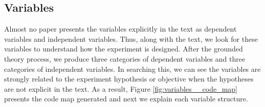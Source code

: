 	\begin{figure}[h] 

   	    \captionsetup{width=6cm}%
	\end{figure}
	
\subsection{Variables}
\label{subsec:results-variables}

Almost no paper presents the variables explicitly in the text as dependent variables and independent variables. Thus, along with the text, we look for these variables to understand how the experiment is designed. After the grounded theory process, we produce three categories of dependent variables and three categories of independent variables. In searching this, we can see the variables are strongly related to the experiment hypothesis or objective when the hypotheses are not explicit in the text. As a result, Figure \ref{fig:variables__code_map} presents the code map generated and next we explain each variable structure.
\begin{landscape}
     	\begin{figure}[h] 

   	    \captionsetup{width=25cm}%
	\end{figure}
\end{landscape}

